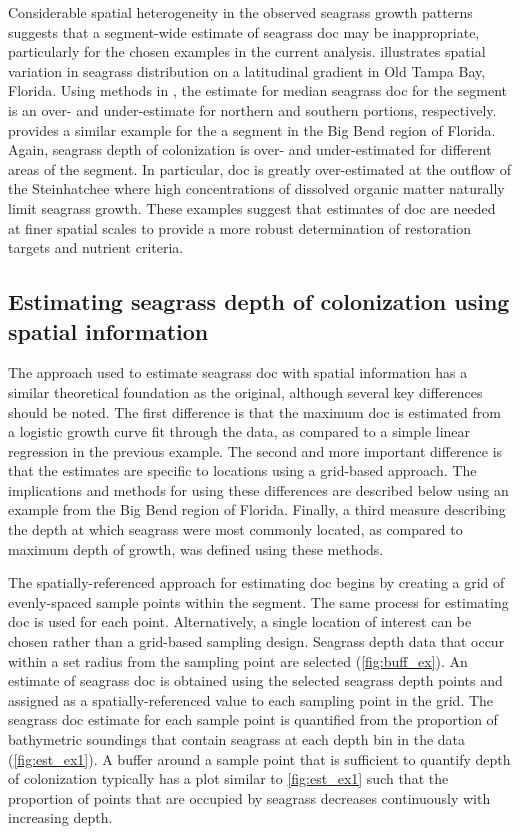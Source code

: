 \documentclass[letterpaper,12pt,oneside]{article}\usepackage[]{graphicx}\usepackage[]{color}
\begin{document}
Considerable spatial heterogeneity in the observed seagrass growth patterns suggests that a segment-wide estimate of seagrass \ac{doc} may be inappropriate, particularly for the chosen examples in the current analysis.  illustrates spatial variation in seagrass distribution on a latitudinal gradient in Old Tampa Bay, Florida.  Using methods in \citet{HagyIR}, the estimate for median seagrass \ac{doc} for the segment is an over- and under-estimate for northern and southern portions, respectively.   provides a similar example for the a segment in the Big Bend region of Florida.  Again, seagrass depth of colonization is over- and under-estimated for different areas of the segment.  In particular, \ac{doc} is greatly over-estimated at the outflow of the Steinhatchee where high concentrations of dissolved organic matter naturally limit seagrass growth.  These examples suggest that estimates of \ac{doc} are needed at finer spatial scales to provide a more robust determination of restoration targets and nutrient criteria.

\subsection{Estimating seagrass depth of colonization using spatial information}

The approach used to estimate seagrass \ac{doc} with spatial information has a similar theoretical foundation as the original, although several key differences should be noted.  The first difference is that the maximum \ac{doc} is estimated from a logistic growth curve fit through the data, as compared to a simple linear regression in the previous example.  The second and more important difference is that the estimates are specific to locations using a grid-based approach.  The implications and methods for using these differences are described below using an example from the Big Bend region of Florida.  Finally, a third measure describing the depth at which seagrass were most commonly located, as compared to maximum depth of growth, was defined using these methods.                                    

The spatially-referenced approach for estimating \ac{doc} begins by creating a grid of evenly-spaced sample points within the segment.  The same process for estimating \ac{doc} is used for each point.  Alternatively, a single location of interest can be chosen rather than a grid-based sampling design.  Seagrass depth data that occur within a set radius from the sampling point are selected (\cref{fig:buff_ex}).  An estimate of seagrass \ac{doc} is obtained using the selected seagrass depth points and assigned as a spatially-referenced value to each sampling point in the grid.  The seagrass \ac{doc} estimate for each sample point is quantified from the proportion of bathymetric soundings that contain seagrass at each depth bin in the data (\cref{fig:est_ex1}).  A buffer around a sample point that is sufficient to quantify depth of colonization typically has a plot similar to \cref{fig:est_ex1} such that the proportion of points that are occupied by seagrass decreases continuously with increasing depth.  
\end{document}
